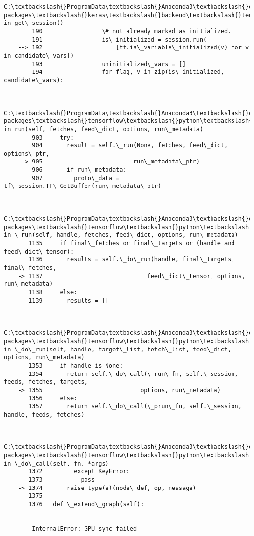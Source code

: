 \documentclass[11pt]{article}
\begin{document}
\begin{Verbatim}[commandchars=\\\{\}]
        C:\textbackslash{}ProgramData\textbackslash{}Anaconda3\textbackslash{}envs\textbackslash{}nbkeras\textbackslash{}lib\textbackslash{}site-packages\textbackslash{}keras\textbackslash{}backend\textbackslash{}tensorflow\_backend.py in get\_session()
        190                 \# not already marked as initialized.
        191                 is\_initialized = session.run(
    --> 192                     [tf.is\_variable\_initialized(v) for v in candidate\_vars])
        193                 uninitialized\_vars = []
        194                 for flag, v in zip(is\_initialized, candidate\_vars):
    

        C:\textbackslash{}ProgramData\textbackslash{}Anaconda3\textbackslash{}envs\textbackslash{}nbkeras\textbackslash{}lib\textbackslash{}site-packages\textbackslash{}tensorflow\textbackslash{}python\textbackslash{}client\textbackslash{}session.py in run(self, fetches, feed\_dict, options, run\_metadata)
        903     try:
        904       result = self.\_run(None, fetches, feed\_dict, options\_ptr,
    --> 905                          run\_metadata\_ptr)
        906       if run\_metadata:
        907         proto\_data = tf\_session.TF\_GetBuffer(run\_metadata\_ptr)
    

        C:\textbackslash{}ProgramData\textbackslash{}Anaconda3\textbackslash{}envs\textbackslash{}nbkeras\textbackslash{}lib\textbackslash{}site-packages\textbackslash{}tensorflow\textbackslash{}python\textbackslash{}client\textbackslash{}session.py in \_run(self, handle, fetches, feed\_dict, options, run\_metadata)
       1135     if final\_fetches or final\_targets or (handle and feed\_dict\_tensor):
       1136       results = self.\_do\_run(handle, final\_targets, final\_fetches,
    -> 1137                              feed\_dict\_tensor, options, run\_metadata)
       1138     else:
       1139       results = []
    

        C:\textbackslash{}ProgramData\textbackslash{}Anaconda3\textbackslash{}envs\textbackslash{}nbkeras\textbackslash{}lib\textbackslash{}site-packages\textbackslash{}tensorflow\textbackslash{}python\textbackslash{}client\textbackslash{}session.py in \_do\_run(self, handle, target\_list, fetch\_list, feed\_dict, options, run\_metadata)
       1353     if handle is None:
       1354       return self.\_do\_call(\_run\_fn, self.\_session, feeds, fetches, targets,
    -> 1355                            options, run\_metadata)
       1356     else:
       1357       return self.\_do\_call(\_prun\_fn, self.\_session, handle, feeds, fetches)
    

        C:\textbackslash{}ProgramData\textbackslash{}Anaconda3\textbackslash{}envs\textbackslash{}nbkeras\textbackslash{}lib\textbackslash{}site-packages\textbackslash{}tensorflow\textbackslash{}python\textbackslash{}client\textbackslash{}session.py in \_do\_call(self, fn, *args)
       1372         except KeyError:
       1373           pass
    -> 1374       raise type(e)(node\_def, op, message)
       1375 
       1376   def \_extend\_graph(self):
    

        InternalError: GPU sync failed

    \end{Verbatim}
\end{document}
